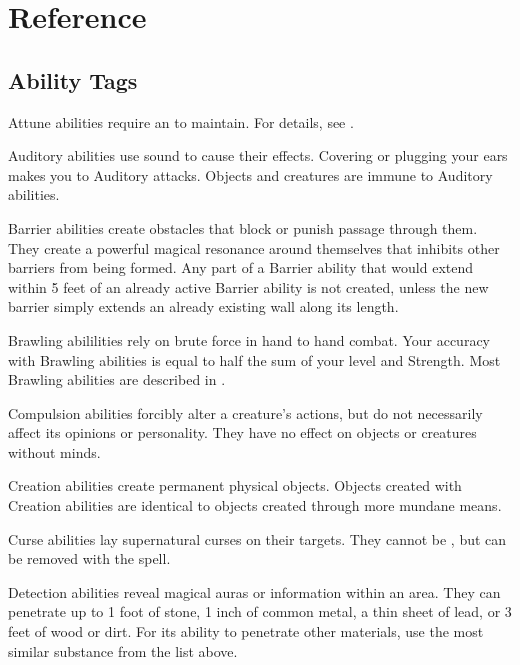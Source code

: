 \chapter{Reference}\label{Reference}

\section{Ability Tags}\label{Ability Tags}

   Attune abilities require an  to maintain.
  For details, see .

   Auditory abilities use sound to cause their effects.
  Covering or plugging your ears makes you \impervious to Auditory attacks.
  Objects and \deafened creatures are immune to Auditory abilities.

   Barrier abilities create obstacles that block or punish passage through them.
  They create a powerful magical resonance around themselves that inhibits other barriers from being formed.
  Any part of a Barrier ability that would extend within 5 feet of an already active Barrier ability is not created, unless the new barrier simply extends an already existing wall along its length.

   Brawling abililities rely on brute force in hand to hand combat.
  Your accuracy with Brawling abilities is equal to half the sum of your level and Strength.
  Most Brawling abilities are described in .

   Compulsion abilities forcibly alter a creature's actions, but do not necessarily affect its opinions or personality.
  They have no effect on objects or creatures without minds.

   Creation abilities create permanent physical objects.
  Objects created with Creation abilities are identical to objects created through more mundane means.

   Curse abilities lay supernatural curses on their targets.
  They cannot be , but can be removed with the  spell.

  \label{Detection} Detection abilities reveal magical auras or information within an area.
  They can penetrate up to 1 foot of stone, 1 inch of common metal, a thin sheet of lead, or 3 feet of wood or dirt.
  For its ability to penetrate other materials, use the most similar substance from the list above.

